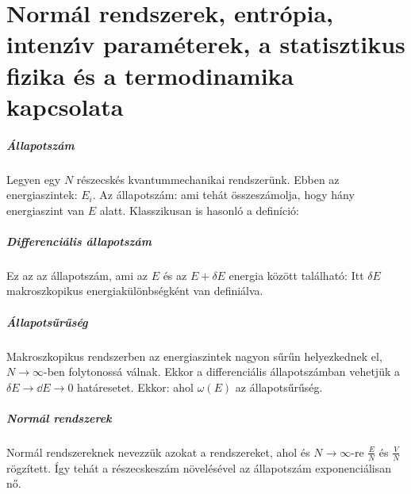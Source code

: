 \chapter{Norm\'al rendszerek, entr\'opia, intenz\'{\i}v param\'eterek, a statisztikus fizika \'es a termodinamika kapcsolata} 
 
 \paragraph{Állapotszám}
  
  Legyen egy $N$ részecskés kvantummechanikai rendszerünk. Ebben az energiaszintek: $E_i$. Az állapotszám:
  ami tehát összeszámolja, hogy hány energiaszint van $E$ alatt. Klasszikusan is hasonló a definíció:
  
 \paragraph{Differenciális állapotszám}
  
  Ez az az állapotszám, ami az $E$ és az $E+\delta E$ energia között található:
  Itt $\delta E$ makroszkopikus energiakülönbségként van definiálva.
  
 \paragraph{Állapotsűrűség}
  
  Makroszkopikus rendszerben az energiaszintek nagyon sűrűn helyezkednek el, $N\to\infty$-ben folytonossá válnak. Ekkor a differenciális állapotszámban vehetjük a $\delta E\to\dd E\to 0$ határesetet. Ekkor:
  ahol $\omega(E)$ az állapotsűrűség. 
  
 \paragraph{Normál rendszerek}
  
  Normál rendszereknek nevezzük azokat a rendszereket, ahol 
  és $N\to\infty$-re $\frac{E}{N}$ és $\frac{V}{N}$ rögzített. Így tehát a részecskeszám növelésével az állapotszám exponenciálisan nő. 
  
